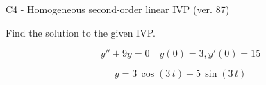 \begin{exercise}
  \begin{exerciseTitle}C4 - Homogeneous second-order linear IVP (ver. 87)\end{exerciseTitle}
  \begin{exerciseStatement}
    
Find the solution to the given IVP.

    
\[y''+9y = 0 \hspace{1em} y(0) = 3 , y'(0) = 15\]

  \end{exerciseStatement}
  \begin{exerciseAnswer}
    
\[y= 3 \, \cos\left(3 \, t\right) + 5 \, \sin\left(3 \, t\right)\]

  \end{exerciseAnswer}
\end{exercise}